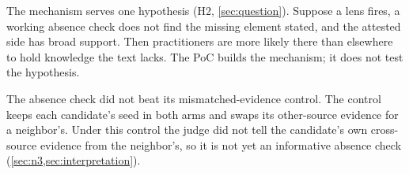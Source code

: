 \evhyp{} The mechanism serves one hypothesis (H2, \cref{sec:question}). Suppose a lens fires, a
working absence check does not find the missing element stated, and the attested side has broad
support. Then practitioners are more likely there than elsewhere to hold knowledge the text lacks. The PoC builds the
mechanism; it does not test the hypothesis.


\begin{evobsbox}
  The absence check did not beat its mismatched-evidence control. The control keeps each candidate's
  seed in both arms and swaps its other-source evidence for a neighbor's. Under this control the judge
  did not tell the candidate's own cross-source evidence from the neighbor's, so it is not yet an
  informative absence check (\cref{sec:n3,sec:interpretation}).
\end{evobsbox}

